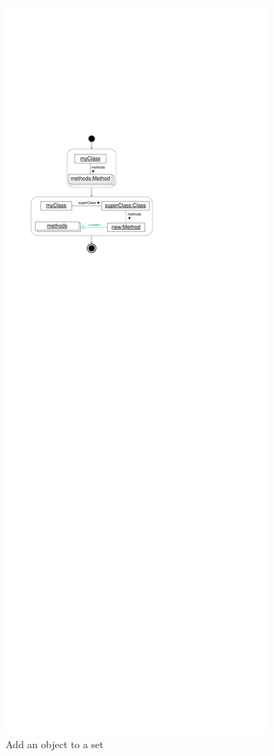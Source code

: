 \begin{figure}[p]
	\begin{minipage}{.45\textwidth}
		\centering
		\includegraphics[scale=.8]{figures/ReuseObjectSet2}
  	\caption{Add an object to a set}

\end{minipage}
\end{figure}
